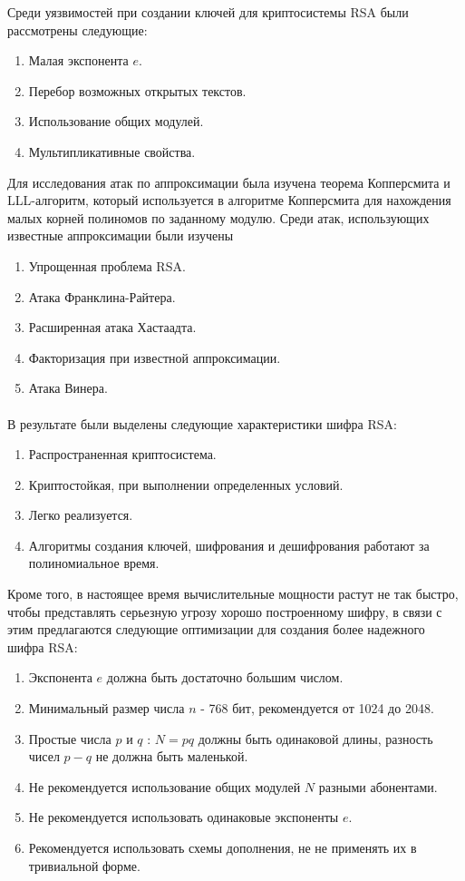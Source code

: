 	Среди уязвимостей при создании ключей для криптосистемы RSA были рассмотрены следующие:
		\begin{enumerate}
			\item Малая экспонента $e$.
			\item Перебор возможных открытых текстов.
			\item Использование общих модулей.
			\item Мультипликативные свойства.
		\end{enumerate}

	Для исследования атак по аппроксимации была изучена теорема Копперсмита и LLL-алгоритм, который используется в алгоритме Копперсмита для нахождения малых корней полиномов по заданному модулю. Среди атак, использующих известные аппроксимации были изучены
		\begin{enumerate}
			\item Упрощенная проблема RSA.
			\item Атака Франклина-Райтера.
			\item Расширенная атака Хастаадта.
			\item Факторизация при известной аппроксимации.
			\item Атака Винера.
		\end{enumerate}

	\paragraph{} В результате были выделены следующие характеристики шифра RSA:

		\begin{enumerate}
			\item Распространенная криптосистема.
			\item Криптостойкая, при выполнении определенных условий.
			\item Легко реализуется.
			\item Алгоритмы создания ключей, шифрования и дешифрования работают за полиномиальное время.
		\end{enumerate}	

	Кроме того, в настоящее время вычислительные мощности растут не так быстро, чтобы представлять серьезную угрозу хорошо построенному шифру, в связи с этим предлагаются следующие оптимизации для создания более надежного шифра RSA:
	
		\begin{enumerate}
			\item Экспонента $e$ должна быть достаточно большим числом.
			\item Минимальный размер числа $n$ - 768 бит, рекомендуется от 1024 до 2048.
			\item Простые числа $p$ и $q$ : $N=pq$ должны быть одинаковой длины, разность чисел $p - q$ не должна быть маленькой.
			\item Не рекомендуется использование общих модулей $N$ разными абонентами.
			\item Не рекомендуется использовать одинаковые экспоненты $e$.
			\item Рекомендуется использовать схемы дополнения, не не применять их в тривиальной форме.
		\end{enumerate}

